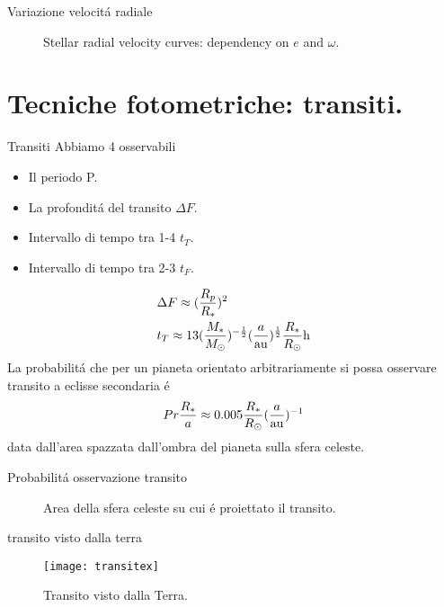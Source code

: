 \begin{wordonframe}{Variazione velocit\'a radiale}
\begin{figure}[!ht]
\centering
\caption{Stellar radial velocity curves: dependency on $e$ and $\omega$.}
\end{figure}
\end{wordonframe}

\section{Tecniche fotometriche: transiti.}

\begin{frame}{Transiti}
Abbiamo 4 osservabili
\begin{itemize}
    \item Il periodo P.
    \item La profondit\'a del transito $\Delta F$.
    \item Intervallo di tempo tra 1-4 $t_T$.
    \item Intervallo di tempo tra 2-3 $t_F$.
\end{itemize}
\begin{align*}
&\Delta F\approx(\frac{R_p}{R_*})^2\\
&t_T\approx13(\frac{M_*}{\msun{}})\expy{-\frac{1}{2}}(\frac{a}{\si{\astronomicalunit}})\expy{\frac{1}{2}}\frac{R_*}{\rsun{}}\si{\hour}
\end{align*}
La probabilit\'a che per un pianeta orientato arbitrariamente si possa osservare transito a eclisse secondaria \'e
\begin{equation*}
Pr\frac{R_*}{a}\approx0.005\frac{R_*}{\rsun{}}(\frac{a}{\si{\astronomicalunit}})\expy{-1}
\end{equation*}
data dall'area spazzata dall'ombra del pianeta sulla sfera celeste.
\end{frame}

\begin{wordonframe}{Probabilit\'a osservazione transito}
\begin{figure}[!ht]
\centering
\caption{Area della sfera celeste su cui \'e proiettato il transito.}
\end{figure}
\end{wordonframe}

\begin{wordonframe}{transito visto dalla terra}
\begin{figure}[!ht]
\centering
\texttt{[image: transitex]}
\caption{Transito visto dalla Terra.}
\end{figure}
\end{wordonframe}

